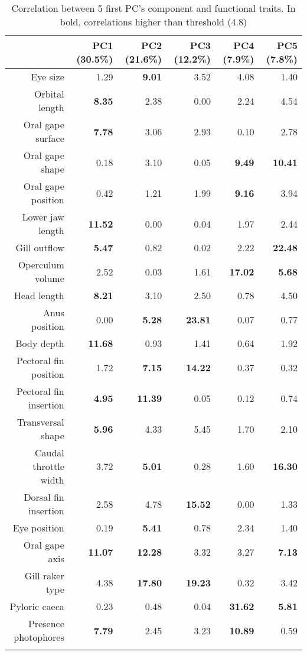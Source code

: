 \begin{table}[!htbp]
\centering
\caption{Correlation between 5 first PC's component and functional traits. In bold, correlations higher than threshold (4.8)}
\label{table:cont_abs}
\begin{adjustbox}{max width=1.1\textwidth,center}
\begin{tabular}{rrrrrr}
  \hline
 & PC1 (30.5\%) & PC2 (21.6\%) & PC3 (12.2\%) & PC4 (7.9\%) & PC5 (7.8\%) \\ 
  \hline
  Eye size & 1.29 & \textbf{9.01} & 3.52 & 4.08 & 1.40 \\ 
  Orbital length & \textbf{8.35} & 2.38 & 0.00 & 2.24 & 4.54 \\ 
  Oral gape surface & \textbf{7.78} & 3.06 & 2.93 & 0.10 & 2.78 \\ 
  Oral gape shape & 0.18 & 3.10 & 0.05 & \textbf{9.49} & \textbf{10.41} \\ 
  Oral gape position & 0.42 & 1.21 & 1.99 & \textbf{9.16} & 3.94 \\ 
  Lower jaw length & \textbf{11.52} & 0.00 & 0.04 & 1.97 & 2.44 \\ 
  Gill outflow & \textbf{5.47} & 0.82 & 0.02 & 2.22 & \textbf{22.48} \\ 
  Operculum volume & 2.52 & 0.03 & 1.61 & \textbf{17.02} & \textbf{5.68} \\ 
  Head length & \textbf{8.21} & 3.10 & 2.50 & 0.78 & 4.50 \\ 
  Anus position & 0.00 & \textbf{5.28} & \textbf{23.81} & 0.07 & 0.77 \\ 
  Body depth & \textbf{11.68} & 0.93 & 1.41 & 0.64 & 1.92 \\ 
  Pectoral fin position & 1.72 & \textbf{7.15} & \textbf{14.22} & 0.37 & 0.32 \\ 
  Pectoral fin insertion & \textbf{4.95} & \textbf{11.39} & 0.05 & 0.12 & 0.74 \\ 
  Transversal shape & \textbf{5.96} & 4.33 & 5.45 & 1.70 & 2.10 \\ 
  Caudal throttle width & 3.72 & \textbf{5.01} & 0.28 & 1.60 & \textbf{16.30} \\ 
  Dorsal fin insertion & 2.58 & 4.78 & \textbf{15.52} & 0.00 & 1.33 \\ 
  Eye position & 0.19 & \textbf{5.41} & 0.78 & 2.34 & 1.40 \\ 
  Oral gape axis & \textbf{11.07} & \textbf{12.28} & 3.32 & 3.27 & \textbf{7.13} \\ 
  Gill raker type & 4.38 & \textbf{17.80} & \textbf{19.23} & 0.32 & 3.42 \\ 
  Pyloric caeca & 0.23 & 0.48 & 0.04 & \textbf{31.62} & \textbf{5.81} \\ 
  Presence photophores & \textbf{7.79} & 2.45 & 3.23 & \textbf{10.89} & 0.59 \\  \\ 
   \hline
\end{tabular}
\end{adjustbox}
\end{table}

